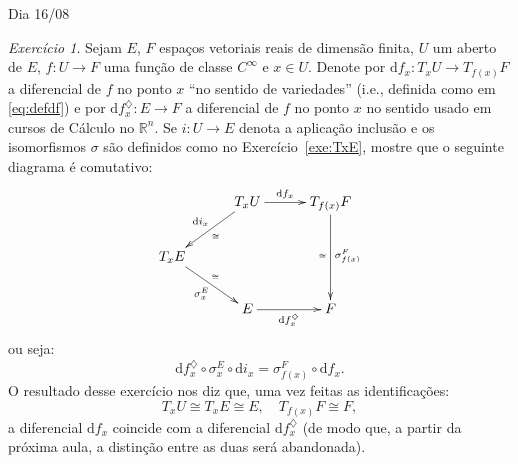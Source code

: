\documentclass[oneside,11pt]{amsart}
\newcommand{\R}{\mathds R}
\newcommand{\dd}{\mathrm d}
\theoremstyle{remark}\newtheorem{exercise}{Exercício}[section]
\theoremstyle{plain}\newtheorem{teo}{Teorema}[section]
\theoremstyle{plain}\newtheorem{lem}[teo]{Lema}
\theoremstyle{plain}\newtheorem{prop}[teo]{Proposição}
\theoremstyle{definition}\newtheorem{defin}[teo]{Definição}
\theoremstyle{remark}\newtheorem{rem}[teo]{Observação}
\theoremstyle{definition}\newtheorem{example}[teo]{Exemplo}
\numberwithin{equation}{section}
\begin{document}
\begin{section}{Dia 16/08}
\begin{exercise}\label{exe:dusual}
Sejam $E$, $F$ espaços vetoriais reais de dimensão finita, $U$ um aberto de $E$, $f:U\to F$ uma função de classe $C^\infty$ e $x\in U$.
Denote por $\dd f_x:T_xU\to T_{f(x)}F$ a diferencial de $f$ no ponto $x$ ``no sentido de variedades'' (i.e., definida como em \eqref{eq:defdf})
e por $\dd f_x^\diamondsuit:E\to F$ a diferencial de $f$ no ponto $x$ no sentido usado em cursos de Cálculo no $\R^n$. Se $i:U\to E$ denota a aplicação inclusão
e os isomorfismos $\sigma$ são definidos como no Exercício~\ref{exe:TxE}, mostre que o seguinte diagrama é comutativo:
\begin{equation}\label{eq:duasdiffs}
\vcenter{\xymatrix@C+5pt{%
&T_xU\ar[dl]_{\dd i_x}^{\scriptscriptstyle\cong}\ar[r]^-{\dd f_x}&T_{f(x)}F\ar[dd]^{\sigma^F_{f(x)}}_{\scriptscriptstyle\cong}\\
T_xE\ar[dr]_{\sigma^E_x}^{\scriptscriptstyle\cong}\\
&E\ar[r]_{\dd f_x^\diamondsuit}&F}}
\end{equation}
ou seja:
\[\dd f_x^\diamondsuit\circ\sigma^E_x\circ\dd i_x=\sigma^F_{f(x)}\circ\dd f_x.\]
O resultado desse exercício nos diz que, uma vez feitas as identificações:
\[T_xU\cong T_xE\cong E,\quad T_{f(x)}F\cong F,\]
a diferencial $\dd f_x$ coincide com a diferencial $\dd f^\diamondsuit_x$ (de modo que, a partir da próxima aula, a distinção
entre as duas será abandonada).
\end{exercise}


\end{section}
\end{document}
